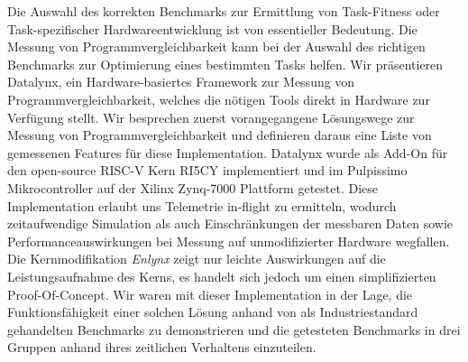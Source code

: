 Die Auswahl des korrekten Benchmarks zur Ermittlung von Task-Fitness oder Task-spezifischer Hardwareentwicklung ist von essentieller Bedeutung. Die Messung von Programmvergleichbarkeit kann bei der Auswahl des richtigen Benchmarks zur Optimierung eines bestimmten Tasks helfen. Wir präsentieren Datalynx, ein Hardware-basiertes Framework zur Messung von Programmvergleichbarkeit, welches die nötigen Tools direkt in Hardware zur Verfügung stellt. Wir besprechen zuerst vorangegangene Lösungswege zur Messung von Programmvergleichbarkeit und definieren daraus eine Liste von gemessenen Features für diese Implementation. Datalynx wurde als Add-On für den open-source RISC-V Kern RI5CY implementiert und im Pulpissimo Mikrocontroller auf der Xilinx Zynq-7000 Plattform getestet. Diese Implementation erlaubt uns Telemetrie in-flight zu ermitteln, wodurch zeitaufwendige Simulation als auch Einschränkungen der messbaren Daten sowie Performanceauswirkungen bei Messung auf unmodifizierter Hardware wegfallen. Die Kernmodifikation \emph{Enlynx} zeigt nur leichte Auswirkungen auf die Leistungsaufnahme des Kerns, es handelt sich jedoch um einen simplifizierten Proof-Of-Concept. Wir waren mit dieser Implementation in der Lage, die Funktionsfähigkeit einer solchen Lösung anhand von als Industriestandard gehandelten Benchmarks zu demonstrieren und die getesteten Benchmarks in drei Gruppen anhand ihres zeitlichen Verhaltens einzuteilen.